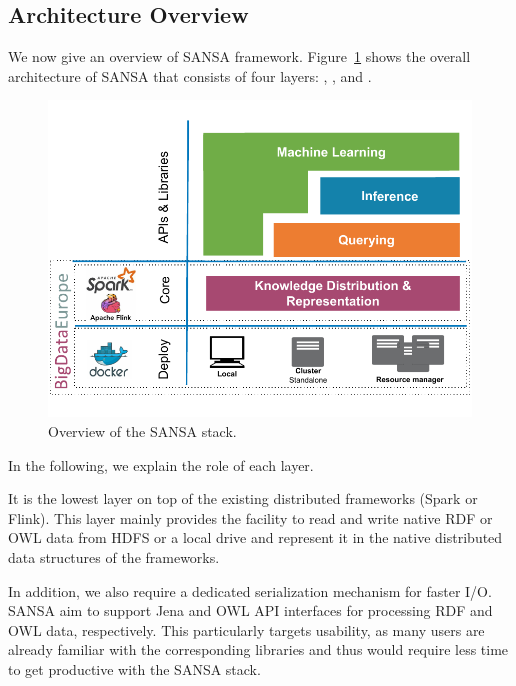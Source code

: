 \subsection{Architecture Overview}
\label{sec:sansa-architecture}

We now give an overview of SANSA framework.
Figure~\ref{fig:imp-use-cases-sansa-architecture} shows the overall architecture of SANSA that consists of four layers: , ,  and .

\begin{figure}
\centering 
	\includegraphics[width=0.95\columnwidth]{images/7_implemenation_and_usecases/sansa-architecture.pdf}
	\caption{Overview of the SANSA stack.}
	\label{fig:imp-use-cases-sansa-architecture}
\end{figure}

In the following, we explain the role of each layer.

It is the lowest layer on top of the existing distributed frameworks (Spark or Flink).
This layer mainly provides the facility to read and write native RDF or OWL data from HDFS or a local drive and represent it in the native distributed data structures of the frameworks.

In addition, we also require a dedicated serialization mechanism for faster I/O. 
SANSA aim to support Jena and OWL API interfaces for processing RDF and OWL data, respectively.
This particularly targets usability, as many users are already familiar with the corresponding libraries and thus would require less time to get productive with the SANSA stack.

